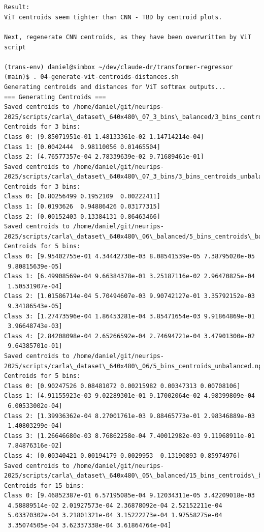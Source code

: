 \begin{verbatim}


Result:
ViT centroids seem tighter than CNN - TBD by centroid plots.

Next, regenerate CNN centroids, as they have been overwritten by ViT script

(trans-env) daniel@simbox ~/dev/claude-dr/transformer-regressor (main)$ . 04-generate-vit-centroids-distances.sh
Generating centroids and distances for ViT softmax outputs...
=== Generating Centroids ===
Saved centroids to /home/daniel/git/neurips-2025/scripts/carla\_dataset\_640x480\_07_3_bins\_balanced/3_bins_centroids\_balanced.npy
Centroids for 3 bins:
Class 0: [9.85071951e-01 1.48133361e-02 1.14714214e-04]
Class 1: [0.0042444  0.98110056 0.01465504]
Class 2: [4.76577357e-04 2.78339639e-02 9.71689461e-01]
Saved centroids to /home/daniel/git/neurips-2025/scripts/carla\_dataset\_640x480\_07_3_bins/3_bins_centroids_unbalanced.npy
Centroids for 3 bins:
Class 0: [0.80256499 0.1952109  0.00222411]
Class 1: [0.0193626  0.94886426 0.03177315]
Class 2: [0.00152403 0.13384131 0.86463466]
Saved centroids to /home/daniel/git/neurips-2025/scripts/carla\_dataset\_640x480\_06\_balanced/5_bins_centroids\_balanced.npy
Centroids for 5 bins:
Class 0: [9.95402755e-01 4.34442730e-03 8.08541539e-05 7.38795020e-05
 9.80815639e-05]
Class 1: [6.49908569e-04 9.66384378e-01 3.25187116e-02 2.96470825e-04
 1.50531907e-04]
Class 2: [1.01586714e-04 5.70494607e-03 9.90742127e-01 3.35792152e-03
 9.34186543e-05]
Class 3: [1.27473596e-04 1.86453281e-04 3.85471654e-03 9.91864869e-01
 3.96648743e-03]
Class 4: [2.84208098e-04 2.65266592e-04 2.74694721e-04 3.47901300e-02
 9.64385701e-01]
Saved centroids to /home/daniel/git/neurips-2025/scripts/carla\_dataset\_640x480\_06/5_bins_centroids_unbalanced.npy
Centroids for 5 bins:
Class 0: [0.90247526 0.08481072 0.00215982 0.00347313 0.00708106]
Class 1: [4.91155923e-03 9.02289301e-01 9.17002064e-02 4.98399809e-04
 6.00533002e-04]
Class 2: [1.39936362e-04 8.27001761e-03 9.88465773e-01 2.98346889e-03
 1.40803299e-04]
Class 3: [1.26646680e-03 8.76862258e-04 7.40012982e-03 9.11968911e-01
 7.84876316e-02]
Class 4: [0.00340421 0.00194179 0.0029953  0.13190893 0.85974976]
Saved centroids to /home/daniel/git/neurips-2025/scripts/carla\_dataset\_640x480\_05\_balanced/15_bins_centroids\_balanced.npy
Centroids for 15 bins:
Class 0: [9.46852387e-01 6.57195085e-04 9.12034311e-05 3.42209018e-03
 4.58889514e-02 2.01927573e-04 2.36878092e-04 2.52152211e-04
 5.03370302e-04 3.21801321e-04 3.15222273e-04 1.97558275e-04
 3.35074505e-04 3.62337338e-04 3.61864764e-04]

\end{verbatim}
